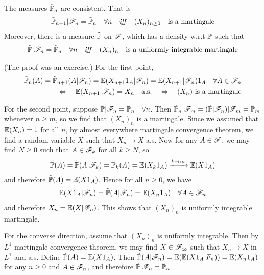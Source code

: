 \documentclass[10pt,a4paper]{report}
\newenvironment{proof}
{\begin{changemargin}{1cm}{0.5cm} 
	}%
	{\end{changemargin}
}
\begin{document}
 The measures $\tilde{\mathbb{P}}_n$ are consistent. That is
\begin{align*}
\tilde{\mathbb{P}}_{n+1} | \mathscr{F}_n = \tilde{\mathbb{P}}_n \quad \forall n \quad \text{\emph{iff}} \quad (X_n)_{n\geq 0} \quad \text{is a martingale}
\end{align*}
Moreover, there is a measure $\tilde{\mathbb{P}}$ on $\mathscr{F}$, which has a density w.r.t $\mathbb{P}$ such that
\begin{align*}
\tilde{\mathbb{P}} |\mathscr{F}_n = \tilde{\mathbb{P}}_n \quad \forall n \quad \text{\emph{iff}} \quad (X_n)_n \quad \text{is a uniformly integrable martingale}
\end{align*}
\begin{proof}
\pf (The proof was an exercise.)
For the first point,
\begin{align*}
\tilde{\mathbb{P}}_n (A) = \tilde{\mathbb{P}}_{n+1}(A |\mathscr{F}_n) = \mathbb{E}(X_{n+1} 1_A |\mathscr{F}_n) = \mathbb{E}(X_{n+1}|\mathscr{F}_n) 1_A  \quad \forall A \in \mathscr{F}_n \\
\Leftrightarrow \quad \mathbb{E}(X_{n+1} |\mathscr{F}_n) = X_n \quad \text{a.s.} \quad \Leftrightarrow \quad (X_n) \text{ is a martingale}
\end{align*}

\quad For the second point, suppose $\tilde{\mathbb{P}} |\mathscr{F}_n = \tilde{\mathbb{P}}_n \quad \forall n$. Then $\tilde{\mathbb{P}}_n |\mathscr{F}_m  =(\tilde{\mathbb{P}} | \mathscr{F}_n) | \mathscr{F}_m = \tilde{\mathbb{P}}_m$ whenever $n\geq m$, so we find that $(X_n)_n$ is a martingale. Since we assumed that $\mathbb{E}(X_n)=1$ for all $n$, by almost everywhere martingale convergence theorem, we find a random variable $X$ such that $X_n \rightarrow X$ a.s. Now for any $A \in \mathscr{F}$, we may find $N \geq 0$ such that $A\in \mathscr{F}_k$ for all $k\geq N$, so
\begin{align*}
\tilde{\mathbb{P}}(A) = \tilde{\mathbb{P}}(A |\mathscr{F}_k) = \tilde{\mathbb{P}}_k (A) = \mathbb{E}(X_k 1_A) \xrightarrow{k\rightarrow \infty} \mathbb{E}(X 1_A)
\end{align*}
and therefore $\tilde{\mathbb{P}}(A) = \mathbb{E}(X 1_A)$. Hence for all $n \geq 0$, we have
\begin{align*}
\mathbb{E}(X 1_A|\mathscr{F}_n) = \tilde{\mathbb{P}}(A |\mathscr{F}_n) = \mathbb{E}(X_n 1_A) \quad \forall A \in \mathscr{F}_n
\end{align*} 
and therefore $X_n = \mathbb{E}(X|\mathscr{F}_n)$. This shows that $(X_n)_n$ is uniformly integrable martingale.

\quad For the converse direction, assume that $(X_n)_n$ is uniformly integrable. Then by $L^1$-martingale convergence theorem, we may find $X \in \mathscr{F}_{\infty}$ such that $X_n \rightarrow X$ in $L^1$ and a.s. Define $\tilde{\mathbb{P}}(A) = \mathbb{E}(X 1_A)$. Then $\tilde{\mathbb{P}}(A |\mathscr{F}_n) = \mathbb{E}(\mathbb{E}(X 1_A |F_n)) = \mathbb{E}(X_n 1_A)$ for any $n\geq 0$ and $A\in \mathscr{F}_n$, and therefore $\tilde{\mathbb{P}} | \mathscr{F}_n = \tilde{\mathbb{P}}_n$. 

\eop 
\end{proof}
\s
\end{document}
